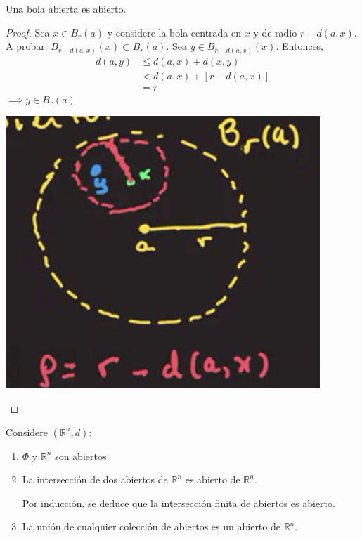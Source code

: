 \begin{prop}
	Una bola abierta es abierto. 
\end{prop}
\begin{proof}
	Sea $x\in B_r(a)$ y considere la bola centrada en $x$ y de radio $r-d(a,x)$. A probar: $B_{r-d(a,x)}(x)\subset B_r(a)$. Sea $y\in B_{r-d(a,x)}(x)$. Entonces, 
	\begin{align*}
		d(a,y) &\leq d(a,x)+d(x,y)\\
		&< d(a,x)+[r-d(a,x)]\\
		&= r
	\end{align*}
$\implies y \in B_r(a)$. 

 	\begin{center}
 	\includegraphics[scale=0.4]{images/2/4}
 \end{center}
\end{proof}

\begin{teorema}
	Considere $(\mathbb{R}^n,d)$: 
	\begin{enumerate}
		\item $\Phi$ y $\mathbb{R}^n$ son abiertos. 
		\item La intersección de dos abiertos de $\mathbb{R}^n$ es abierto de $\mathbb{R}^n$. 
		\begin{cajita}
			Por inducción, se deduce que la intersección finita de abiertos es abierto. 
		\end{cajita}
		\item La unión de cualquier colección de abiertos es un abierto de $\mathbb{R}^n$. 
	\end{enumerate}
\end{teorema}

